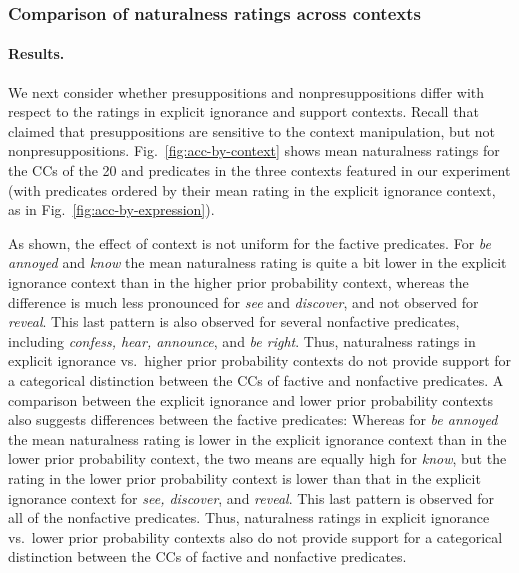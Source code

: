 \documentclass[11pt,fleqn]{article}
\newcommand{\6}{\mbox{$[\hspace*{-.6mm}[$}}
\newcommand{\9}{\mbox{$]\hspace*{-.6mm}]$}}
\begin{document}
\subsubsection{Comparison of naturalness ratings across contexts}\label{s:analysis2}

\paragraph{Results.} We next consider whether presuppositions and nonpresuppositions differ with respect to the ratings in explicit ignorance and support contexts. Recall that \citealt{mandelkern-etal2020} claimed that presuppositions are sensitive to the context manipulation, but not nonpresuppositions. Fig.~\ref{fig:acc-by-context} shows mean naturalness ratings for the CCs of the 20  and  predicates in the three contexts featured in our experiment (with predicates ordered by their mean rating in the explicit ignorance context, as in Fig.~\ref{fig:acc-by-expression}).

As shown, the effect of context is not uniform for the factive predicates. For {\em be annoyed} and {\em know} the mean naturalness rating is quite a bit lower in the explicit ignorance context than in the higher prior probability context, whereas the difference is much less pronounced for {\em see} and {\em discover}, and not observed for {\em reveal}. This last pattern is also observed for several nonfactive predicates, including {\em confess, hear, announce}, and {\em be right}. Thus, naturalness ratings in explicit ignorance vs.\ higher prior probability contexts do not provide support for a categorical distinction between the CCs of factive and nonfactive predicates. A comparison between the explicit ignorance and lower prior probability contexts also suggests differences between the factive predicates: Whereas for {\em be annoyed} the mean naturalness rating is lower in the explicit ignorance context than in the lower prior probability context, the two means are equally high for {\em know}, but the rating in the lower prior probability context is lower than that in the explicit ignorance context for {\em see, discover}, and {\em reveal}. This last pattern is observed for all of the nonfactive predicates. Thus, naturalness ratings in explicit ignorance vs.\ lower prior probability contexts also do not provide support for a categorical distinction between the CCs of factive and nonfactive predicates. 
\end{document}
